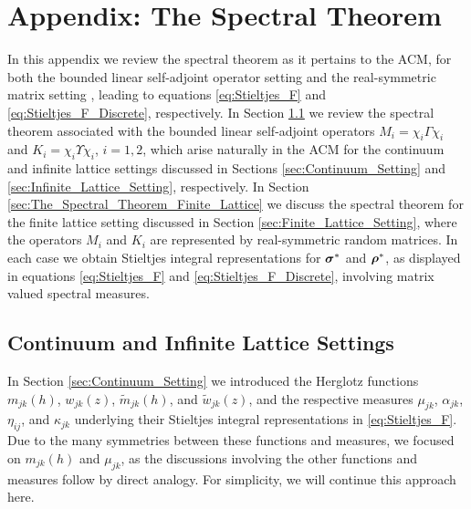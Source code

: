 \documentclass{cmslatex}
\newcommand\bsig{\mbox{\boldmath${\sigma}$}}
\newcommand\brho{\mbox{\boldmath${\rho}$}}
\begin{document}
\section{Appendix: The Spectral Theorem} 
\label{sec:The_Spectral_Theorem}
%
In this appendix we review the spectral theorem as it pertains to the
ACM, for both the bounded linear self-adjoint operator setting
\cite{Reed-1980,Stone:64} and the real-symmetric matrix setting
\cite{Kreyszig:JWS-1989,Halmos-1958}, leading to equations
\eqref{eq:Stieltjes_F} and \eqref{eq:Stieltjes_F_Discrete}, 
respectively. In Section \ref{sec:The_Spectral_Theorem_Continuum} we
review the spectral theorem associated with the bounded linear
self-adjoint operators $M_i=\chi_i\Gamma\chi_i$ and $K_i=\chi_i\Upsilon\chi_i$, $i=1,2$, which
arise naturally in the ACM for the continuum and infinite lattice
settings discussed in Sections \ref{sec:Continuum_Setting} and
\ref{sec:Infinite_Lattice_Setting}, respectively.  In Section 
\ref{sec:The_Spectral_Theorem_Finite_Lattice} we discuss the spectral 
theorem for the finite lattice setting discussed in Section
\ref{sec:Finite_Lattice_Setting}, where the operators $M_i$ and $K_i$
are represented by real-symmetric random matrices. In each case we
obtain Stieltjes integral representations for $\bsig^*$ and $\brho^*$,
as displayed in equations \eqref{eq:Stieltjes_F} and
\eqref{eq:Stieltjes_F_Discrete}, involving matrix valued spectral
measures. 
%
\subsection{Continuum  and Infinite Lattice Settings}
\label{sec:The_Spectral_Theorem_Continuum} 
%
In Section \ref{sec:Continuum_Setting} we introduced the Herglotz 
functions $m_{jk}(h)$, $w_{jk}(z)$, $\tilde{m}_{jk}(h)$, and
$\tilde{w}_{jk}(z)$, and the respective measures $\mu_{jk}$, $\alpha_{jk}$,
$\eta_{ij}$, and $\kappa_{jk}$ underlying their Stieltjes integral
representations in \eqref{eq:Stieltjes_F}. Due to the many symmetries
between these functions and measures, we focused on $m_{jk}(h)$ and
$\mu_{jk}$, as the discussions involving the other functions and
measures follow by direct analogy. For simplicity, we will continue
this approach here.  
\end{document}
